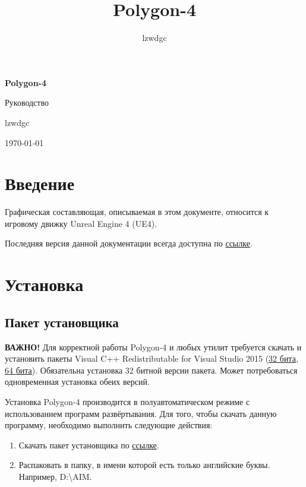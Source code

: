 \documentclass[a4paper,12pt]{report}
\author{lzwdgc}
\title{Polygon-4}
\newcommand{\ue}{UE4\xspace}
\newcommand{\pf}{Polygon-4\xspace}
\begin{document}
\large %

\begin{titlepage}
\centering
\vspace*{7cm}
{\huge\bfseries Polygon-4\par}
\vspace{1.5cm}
{\Large Руководство\par}
\vspace{1.5cm}
lzwdgc
\vfill
{\today\par}
\end{titlepage}
\setcounter{page}{2}
\tableofcontents

\chapter*{Введение}

Графическая составляющая, описываемая в этом документе, относится к игровому движку Unreal Engine 4 (\ue).

Последняя версия данной документации всегда доступна по \href{https://www.dropbox.com/s/ipnakg5civ0xp0g/Polygon4_ru.pdf?dl=1}{ссылке}.

\chapter{Установка}

\section{Пакет установщика}


\textbf{ВАЖНО!} Для корректной работы \pf и любых утилит требуется скачать и установить пакеты Visual C++ Redistributable for Visual Studio 2015 (\href{https://download.microsoft.com/download/9/3/F/93FCF1E7-E6A4-478B-96E7-D4B285925B00/vc_redist.x86.exe}{32 бита}, \href{https://download.microsoft.com/download/9/3/F/93FCF1E7-E6A4-478B-96E7-D4B285925B00/vc_redist.x64.exe}{64 бита}).
Обязательна установка 32 битной версии пакета.
Может потребоваться одновременная установка обеих версий.

Установка \pf производится в полуавтоматическом режиме с использованием программ развёртывания.
Для того, чтобы скачать данную программу, необходимо выполнить следующие действия:

\begin{enumerate}
\item Скачать пакет установщика по \href{https://www.dropbox.com/s/0zhbgb1ftspcv9w/polygon4.zip?dl=1}{ссылке}.
\item Распаковать в папку, в имени которой есть только английские буквы. Например, D:\backslash AIM.
\end{enumerate}
\end{document}
